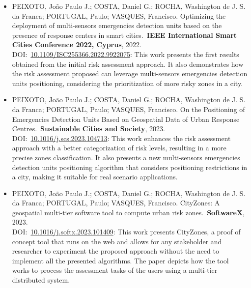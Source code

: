 \begin{refsection}
\begin{itemize}
  \item \uppercase{Peixoto}, João Paulo J.; \uppercase{Costa}, Daniel G.; \uppercase{Rocha}, Washington de J. S. da Franca; \uppercase{Portugal}, Paulo; \uppercase{Vasques}, Francisco. Optimizing the deployment of multi-sensors emergencies detection units based on the presence of response centers in smart cities.\ \textbf{IEEE International Smart Cities Conference 2022, Cyprus}, 2022. DOI:\ \hyperref{https://doi.org/10.1109/ISC255366.2022.9922075}{}{}{10.1109/ISC255366.2022.9922075}: This work presents the first results obtained from the initial risk assessment approach. It also demonstrates how the risk assessment proposed can leverage multi-sensors emergencies detection units positioning, considering the prioritization of more risky zones in a city.

  \item \uppercase{Peixoto}, João Paulo J.; \uppercase{Costa}, Daniel G.; \uppercase{Rocha}, Washington de J. S. da Franca; \uppercase{Portugal}, Paulo; \uppercase{Vasques}, Francisco. On the Positioning of Emergencies Detection Units Based on Geospatial Data of Urban Response Centres.\ \textbf{Sustainable Cities and Society}, 2023. DOI:\ \hyperref{https://doi.org/10.1016/j.scs.2023.104713}{}{}{10.1016/j.scs.2023.104713}: This work enhances the risk assessment approach with a better categorization of risk levels, resulting in a more precise zones classification. It also presents a new multi-sensors emergencies detection units positioning algorithm that considers positioning restrictions in a city, making it suitable for real scenario applications.

  \item \uppercase{Peixoto}, João Paulo J.; \uppercase{Costa}, Daniel G.; \uppercase{Rocha}, Washington de J. S. da Franca; \uppercase{Portugal}, Paulo; \uppercase{Vasques}, Francisco. CityZones: A geospatial multi-tier software tool to compute urban risk zones.\ \textbf{SoftwareX}, 2023.\\DOI:\ \hyperref{https://doi.org/10.1016/j.softx.2023.101409}{}{}{10.1016/j.softx.2023.101409}: This work presents CityZones, a proof of concept tool that runs on the web and allows for any stakeholder and researcher to experiment the proposed approach without the need to implement all the presented algorithms. The paper depicts how the tool works to process the assessment tasks of the users using a multi-tier distributed system.


\end{itemize}
\end{refsection}
